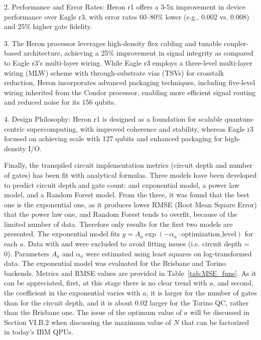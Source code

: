 \documentclass[conference,twoside]{IEEEtran}
\begin{document}
\begin{itemize}
2. Performance and Error Rates: Heron r1 offers a 3-5x improvement in device performance over Eagle r3, with error rates 60–80\% lower (e.g., \num{0.002} vs. \num{0.008}) and 25\% higher gate fidelity.

3. The Heron processor leverages high-density flex cabling and tunable coupler-based architecture, achieving a 25\% improvement in signal integrity as compared to Eagle r3’s multi-layer wiring. While Eagle r3 employs a three-level multi-layer wiring (MLW) scheme with through-substrate vias (TSVs) for crosstalk reduction, Heron incorporates advanced packaging techniques, including five-level wiring inherited from the Condor processor, enabling more efficient signal routing and reduced noise for its 156 qubits\citep*{IBM2025}.

4. Design Philosophy: Heron r1 is designed as a foundation for scalable quantum-centric supercomputing, with improved coherence and stability, whereas Eagle r3 focused on achieving scale with 127 qubits and enhanced packaging for high-density I/O.
\end{itemize}
Finally, the transpiled circuit implementation metrics (circuit depth and number of gates) has been fit with analytical formulas. Three models have been developed to predict circuit depth and gate count: and exponential model, a power law model, and a Random Forest model. From the three, it was found  that the best one is the exponential one, as it produces lower RMSE (Root Mean Square Error) that the power law one, and Random Forest tends to overfit, because of the limited number of data. Therefore only results for the first two models are presented.
The exponential model fits $y = A_a \exp(-\alpha_a \cdot \text{optimization\_level})$ for each $a$. Data with  and  were excluded to avoid fitting issues (i.e. circuit depth = 0). Parameters $A_a$ and $\alpha_a$ were estimated using least squares on log-transformed data.
The exponential model was evaluated for the Brisbane and Torino backends. Metrics and RMSE values are provided in Table~\ref{tab:MSE_funs}. As it can be appreciated, first, at this stage there is no clear trend with $a$, and second, the coefficient in the exponential varies with $a$, it is larger for the number of gates than for the circuit depth, and it is about 0.02 larger for the Torino QC, rather than the Brisbane one. The issue of the optimum value of $a$ will be discussed in Section VI.B.2 when discussing the maximum value of $N$ that can be factorized in today's IBM QPUs.
\end{document}
